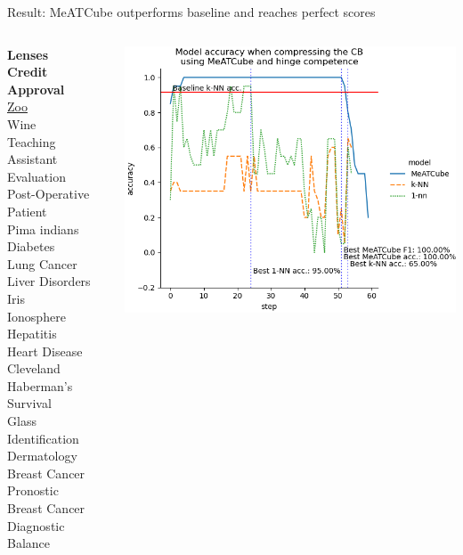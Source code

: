 \documentclass[]{beamer}
\begin{document}
\begin{frame}{Result: {\smaller MeATCube outperforms baseline and reaches perfect scores}}
    \begin{columns}
        \begin{column}{.35\textwidth}
            {\smaller\smaller
            \textbf{Lenses} \\
            \textbf{Credit Approval} \\
            \underline{Zoo} \\
            Wine \\
            Teaching Assistant Evaluation \\
            Post-Operative Patient \\
            Pima indians Diabetes \\
            Lung Cancer \\
            Liver Disorders \\
            Iris \\
            Ionosphere \\
            Hepatitis \\
            Heart Disease Cleveland \\
            Haberman's Survival \\
            Glass Identification \\
            Dermatology \\
            Breast Cancer Pronostic \\
            Breast Cancer Diagnostic \\
            Balance\\
            ~}
        \end{column}
        \begin{column}{.65\textwidth}
            \includegraphics[width=.8\textwidth]{../results/figs/zoo}

\end{column}
\end{columns}
\end{frame}
\end{document}
